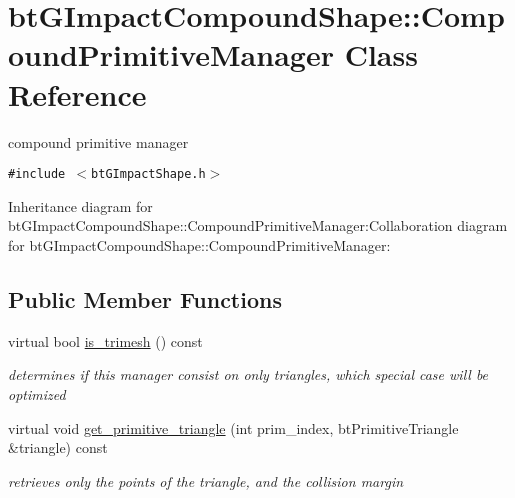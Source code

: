 \hypertarget{classbt_g_impact_compound_shape_1_1_compound_primitive_manager}{
\section{btGImpactCompoundShape::CompoundPrimitiveManager Class Reference}
\label{classbt_g_impact_compound_shape_1_1_compound_primitive_manager}
}
compound primitive manager  


{\tt \#include $<$btGImpactShape.h$>$}

Inheritance diagram for btGImpactCompoundShape::CompoundPrimitiveManager:Collaboration diagram for btGImpactCompoundShape::CompoundPrimitiveManager:\subsection*{Public Member Functions}
\begin{CompactItemize}
\item 
\hypertarget{classbt_g_impact_compound_shape_1_1_compound_primitive_manager_fe172518435ae7db098a1e923f924861}{
virtual bool \hyperlink{classbt_g_impact_compound_shape_1_1_compound_primitive_manager_fe172518435ae7db098a1e923f924861}{is\_\-trimesh} () const }
\label{classbt_g_impact_compound_shape_1_1_compound_primitive_manager_fe172518435ae7db098a1e923f924861}

\begin{CompactList}\small\item\em determines if this manager consist on only triangles, which special case will be optimized \item\end{CompactList}\item 
\hypertarget{classbt_g_impact_compound_shape_1_1_compound_primitive_manager_cd5e9759ed51edee18f6c553ddaad6e2}{
virtual void \hyperlink{classbt_g_impact_compound_shape_1_1_compound_primitive_manager_cd5e9759ed51edee18f6c553ddaad6e2}{get\_\-primitive\_\-triangle} (int prim\_\-index, btPrimitiveTriangle \&triangle) const }
\label{classbt_g_impact_compound_shape_1_1_compound_primitive_manager_cd5e9759ed51edee18f6c553ddaad6e2}

\begin{CompactList}\small\item\em retrieves only the points of the triangle, and the collision margin \item\end{CompactList}\end{CompactItemize}


